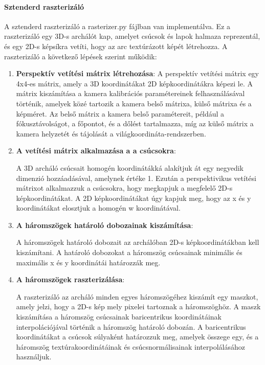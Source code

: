 \documentclass[12pt,a4]{article}
\begin{document}
         \paragraph{Sztenderd raszterizáló}

             A sztenderd raszterizáló a rasterizer.py fájlban van implementálva.
             Ez a raszterizáló egy 3D-s archálót kap, amelyet csúcsok és lapok halmaza reprezentál, és egy 2D-s képsíkra vetíti, hogy az arc textúrázott képét létrehozza.
             A raszterizáló a következő lépések szerint működik:
             \begin{enumerate}
                 \item \textbf{Perspektív vetítési mátrix létrehozása}:
                        A perspektív vetítési mátrix egy 4x4-es mátrix, amely a 3D koordinátákat 2D képkoordinátákra képezi le. 
            	        A mátrix kiszámítása a kamera kalibrációs paramétereinek felhasználásával történik, amelyek közé tartozik a kamera belső mátrixa, külső mátrixa és a képméret. 
                        Az belső mátrix a kamera belső paramétereit, például a fókusztávolságot, a főpontot, 
                        és a dőlést tartalmazza, míg az külső mátrix a kamera helyzetét és tájolását a világkoordináta-rendszerben.
                 
                 \item \textbf{A vetítési mátrix alkalmazása a a csúcsokra}:
         
                        A 3D archáló csúcsait homogén koordinátákká alakítjuk át egy negyedik dimenzió hozzáadásával, amelynek értéke 1. 
                    	Ezután a perspektivikus vetítési mátrixot alkalmazzuk a csúcsokra, hogy megkapjuk a megfelelő 2D-s képkoordinátákat. 
                    	A 2D képkoordinátákat úgy kapjuk meg, hogy az x és y koordinátákat elosztjuk a homogén w koordinátával.
     
                 \item \textbf{A háromszögek határoló dobozainak kiszámítása}:
         
                        A háromszögek határoló dobozait az archálóban 2D-s képkoordinátákban kell kiszámítani.
                    	A határoló dobozokat a háromszög csúcsainak minimális és maximális x és y koordinátái határozzák meg.
     
                 \item \textbf{A háromszögek raszterizálása}:
         
                        A raszterizáló az archáló minden egyes háromszögéhez kiszámít egy maszkot, amely jelzi, hogy a 2D-s kép mely pixelei tartoznak a háromszöghöz. 
                        A maszk kiszámítása a háromszög csúcsainak baricentrikus koordinátáinak interpolációjával történik a háromszög határoló dobozán.
                    	A baricentrikus koordinátákat a csúcsok súlyaként határozzuk meg, amelyek összege egy, és a háromszög textúrakoordinátáinak és csúcsnormálisainak interpolálásához használjuk.
     

\end{enumerate}
\end{document}
